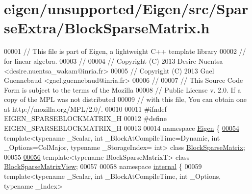 \hypertarget{eigen_2unsupported_2_eigen_2src_2_sparse_extra_2_block_sparse_matrix_8h_source}{}\section{eigen/unsupported/\+Eigen/src/\+Sparse\+Extra/\+Block\+Sparse\+Matrix.h}
\label{eigen_2unsupported_2_eigen_2src_2_sparse_extra_2_block_sparse_matrix_8h_source}

\begin{DoxyCode}
00001 \textcolor{comment}{// This file is part of Eigen, a lightweight C++ template library}
00002 \textcolor{comment}{// for linear algebra.}
00003 \textcolor{comment}{//}
00004 \textcolor{comment}{// Copyright (C) 2013 Desire Nuentsa <desire.nuentsa\_wakam@inria.fr>}
00005 \textcolor{comment}{// Copyright (C) 2013 Gael Guennebaud <gael.guennebaud@inria.fr>}
00006 \textcolor{comment}{//}
00007 \textcolor{comment}{// This Source Code Form is subject to the terms of the Mozilla}
00008 \textcolor{comment}{// Public License v. 2.0. If a copy of the MPL was not distributed}
00009 \textcolor{comment}{// with this file, You can obtain one at http://mozilla.org/MPL/2.0/.}
00010 
00011 \textcolor{preprocessor}{#ifndef EIGEN\_SPARSEBLOCKMATRIX\_H}
00012 \textcolor{preprocessor}{#define EIGEN\_SPARSEBLOCKMATRIX\_H}
00013 
00014 \textcolor{keyword}{namespace }\hyperlink{namespace_eigen}{Eigen} \{ 
\hyperlink{group___sparse_core___module}{00054} \textcolor{keyword}{template}<\textcolor{keyword}{typename} \_Scalar, \textcolor{keywordtype}{int} \_BlockAtCompileTime=Dynamic, \textcolor{keywordtype}{int} \_Options=ColMajor, \textcolor{keyword}{typename} \_StorageIndex=\textcolor{keywordtype}{
      int}> \textcolor{keyword}{class }\hyperlink{group___sparse_core___module_class_eigen_1_1_block_sparse_matrix}{BlockSparseMatrix};
00055 
\hyperlink{class_eigen_1_1_block_sparse_matrix_view}{00056} \textcolor{keyword}{template}<\textcolor{keyword}{typename} BlockSparseMatrixT> \textcolor{keyword}{class }\hyperlink{class_eigen_1_1_block_sparse_matrix_view}{BlockSparseMatrixView};
00057 
00058 \textcolor{keyword}{namespace }\hyperlink{namespaceinternal}{internal} \{
00059 \textcolor{keyword}{template}<\textcolor{keyword}{typename} \_Scalar, \textcolor{keywordtype}{int} \_BlockAtCompileTime, \textcolor{keywordtype}{int} \_Options, \textcolor{keyword}{typename} \_Index>

\end{DoxyCode}
